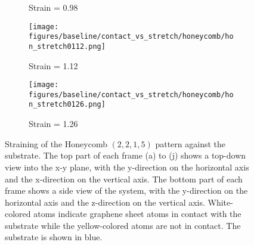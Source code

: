 \begin{figure}[H]
\begin{subfigure}[b]{0.49\textwidth}
        \caption{Strain = 0.98}
    \end{subfigure}
    \begin{subfigure}[b]{0.49\textwidth}
        \centering
        \texttt{[image: figures/baseline/contact\_vs\_stretch/honeycomb/hon\_stretch0112.png]}
        \caption{Strain = 1.12}
    \end{subfigure}
    \begin{subfigure}[b]{0.49\textwidth}
        \centering
        \texttt{[image: figures/baseline/contact\_vs\_stretch/honeycomb/hon\_stretch0126.png]}
        \caption{Strain = 1.26}
    \end{subfigure}
    \hfill
       \caption{Straining of the Honeycomb $(2,2,1,5)$ pattern against the substrate. The top part of each frame (a) to (j) shows a top-down view into the x-y plane, with the y-direction on the horizontal axis and the x-direction on the vertical axis. The bottom part of each frame shows a side view of the system, with the y-direction on the horizontal axis and the z-direction on the vertical axis. White-colored atoms indicate graphene sheet atoms in contact with the substrate while the yellow-colored atoms are not in contact. The substrate is shown in blue. }
       \label{fig:honeycomb_strain}
  \end{figure}
  \pagebreak



  

